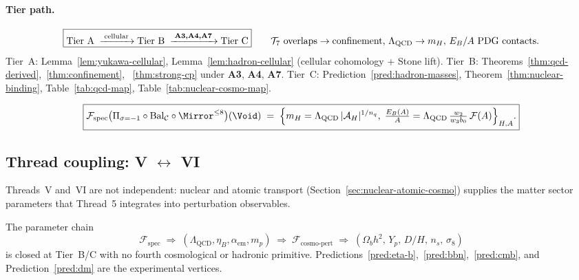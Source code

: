\paragraph{Tier path.}
\begin{equation}\label{eq:thread6-tier}
  \boxed{%
  \mathrm{Tier~A}
  \;\xrightarrow{\;\text{cellular}\;}
  \mathrm{Tier~B}
  \;\xrightarrow{\;\textbf{A3,A4,A7}\;}
  \mathrm{Tier~C}
  }
  \qquad
  \mathcal{T}_7\ \text{overlaps}
  \to
  \text{confinement, }\Lambda_{\mathrm{QCD}}
  \to
  m_H,\,E_B/A\ \text{PDG contacts}.
\end{equation}
Tier~A: Lemma~\ref{lem:yukawa-cellular}, Lemma~\ref{lem:hadron-cellular}
(cellular cohomology + Stone lift).
Tier~B: Theorems~\ref{thm:qcd-derived},~\ref{thm:confinement},
~\ref{thm:strong-cp} under \textbf{A3}, \textbf{A4}, \textbf{A7}.
Tier~C: Prediction~\ref{pred:hadron-masses},
Theorem~\ref{thm:nuclear-binding}, Table~\ref{tab:qcd-map},
Table~\ref{tab:nuclear-cosmo-map}.

\begin{equation}\label{eq:thread6-boxed}
  \boxed{%
  \mathcal{F}_{\mathrm{spec}}
  \bigl(
    \Pi_{\sigma=-1}\circ\mathrm{Bal}_{\mathcal{C}}\circ\Mirror^{\leq 8}
  \bigr)(\Void)
  \;=\;
  \Bigl\{
    m_H=\Lambda_{\mathrm{QCD}}\,|\mathcal{A}_H|^{1/n_q},\;
    \tfrac{E_B(A)}{A}=\Lambda_{\mathrm{QCD}}\,\tfrac{w_2}{w_3 b_0}\,\mathcal{F}(A)
  \Bigr\}_{H,A}.
  }
\end{equation}

\subsection{Thread coupling: V $\leftrightarrow$ VI}
\label{sec:threads-5-6-coupling}

Threads~V and~VI are not independent: nuclear and atomic transport
(Section~\ref{sec:nuclear-atomic-cosmo}) supplies the matter sector
parameters that Thread~5 integrates into perturbation observables.

\begin{proposition}
\label{prop:threads-56-triangle}
The parameter chain
\begin{equation}\label{eq:threads-56-triangle}
  \mathcal{F}_{\mathrm{spec}}
  \;\Longrightarrow\;
  (\Lambda_{\mathrm{QCD}},\eta_B,\alpha_{\mathrm{em}},m_p)
  \;\Longrightarrow\;
  \mathcal{F}_{\mathrm{cosmo\text{-}pert}}
  \;\Longrightarrow\;
  (\Omega_b h^2,\,Y_p,\,D/H,\,n_s,\,\sigma_8)
\end{equation}
is closed at Tier~B/C with no fourth cosmological or hadronic primitive.
Predictions~\ref{pred:eta-b},~\ref{pred:bbn},~\ref{pred:cmb}, and
Prediction~\ref{pred:dm} are the experimental vertices.
\end{proposition}

